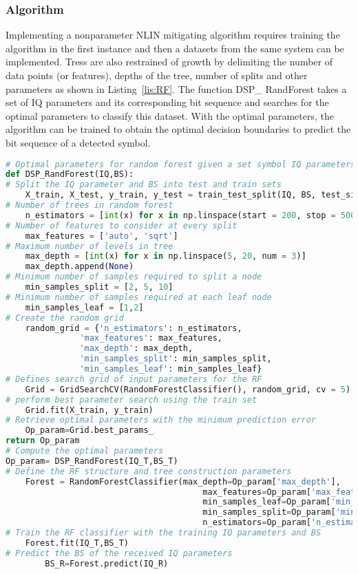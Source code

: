 \subsubsection{Algorithm}
Implementing a nonparameter NLIN mitigating algorithm requires training the algorithm in the first instance and then a datasets from the same system can be implemented. Tress are also restrained of growth by delimiting the number of data points (or features), depths of the tree, number of splits and other parameters as shown in Listing~\ref{lis:RF}. The function DSP\_ RandForest takes a set of IQ parameters and its corresponding bit sequence and searches for the optimal parameters to classify this dataset. With the optimal parameters, the algorithm can be trained to obtain the optimal decision boundaries to predict the bit sequence of a detected symbol.    


\begin{lstlisting}[language=Python,caption=Random forest implementation in python where the optimal parameter are determined form a training dataset. With the optimal parameters the scheme can classify a new set of IQ parameters and determine the decode bit sequence.,label=lis:RF]
# Optimal parameters for random forest given a set symbol IQ parameters and the decoded bit sequence BS
def DSP_RandForest(IQ,BS):
# Split the IQ parameter and BS into test and train sets
	X_train, X_test, y_train, y_test = train_test_split(IQ, BS, test_size = 0.2)
# Number of trees in random forest
	n_estimators = [int(x) for x in np.linspace(start = 200, stop = 500, num = 3)]
# Number of features to consider at every split
	max_features = ['auto', 'sqrt']
# Maximum number of levels in tree
	max_depth = [int(x) for x in np.linspace(5, 20, num = 3)]
	max_depth.append(None)
# Minimum number of samples required to split a node
	min_samples_split = [2, 5, 10]
# Minimum number of samples required at each leaf node
	min_samples_leaf = [1,2]
# Create the random grid
	random_grid = {'n_estimators': n_estimators,
               'max_features': max_features,
               'max_depth': max_depth,
               'min_samples_split': min_samples_split,
               'min_samples_leaf': min_samples_leaf}
# Defines search grid of input parameters for the RF 
    Grid = GridSearchCV(RandomForestClassifier(), random_grid, cv = 5)
# perform best parameter search using the train set
    Grid.fit(X_train, y_train)
# Retrieve optimal parameters with the minimum prediction error 
    Op_param=Grid.best_params_
return Op_param
# Compute the optimal parameters
Op_param= DSP_RandForest(IQ_T,BS_T)
# Define the RF structure and tree construction parameters  
	Forest = RandomForestClassifier(max_depth=Op_param['max_depth'],
										max_features=Op_param['max_features'],
										min_samples_leaf=Op_param['min_samples_leaf'],
										min_samples_split=Op_param['min_samples_split'],
										n_estimators=Op_param['n_estimators'])
# Train the RF classifier with the training IQ parameters and BS       
    Forest.fit(IQ_T,BS_T)
# Predict the BS of the received IQ parameters 
    	BS_R=Forest.predict(IQ_R)
\end{lstlisting}



